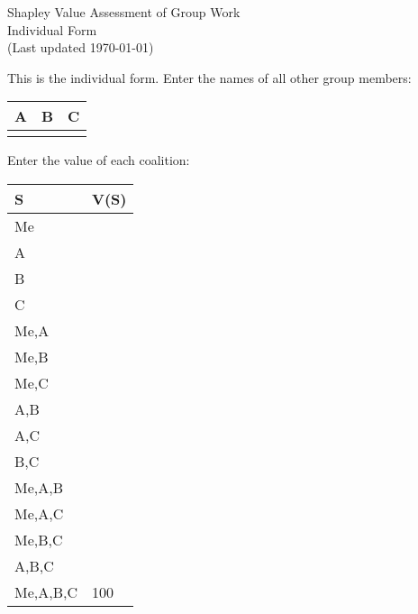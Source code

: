 \documentclass[12pt]{article}
\begin{document}
\begin{center}
\Large{Shapley Value Assessment of Group Work}\\
Individual Form\\
\tiny{(Last updated \today)}
\end{center}
This is the individual form. Enter the names of all other group members:
\vspace{1cm}

\begin{center}
\begin{tabular}{p{3cm}|p{3cm}|p{3cm}}
A&B&C\\
\hline
&&
\end{tabular}
\end{center}
\vspace{1cm}

Enter the value of each coalition:
\vspace{.5cm}

\begin{center}
\begin{tabular}{l|p{2cm}}
S&V(S)\\\hline
Me&\\\hline
A&\\\hline
B&\\\hline
C&\\\hline
Me,A&\\\hline
Me,B&\\\hline
Me,C&\\\hline
A,B&\\\hline
A,C&\\\hline
B,C&\\\hline
Me,A,B&\\\hline
Me,A,C&\\\hline
Me,B,C&\\\hline
A,B,C&\\\hline
Me,A,B,C&100\\\hline
\end{tabular}
\end{center}
\end{document}
